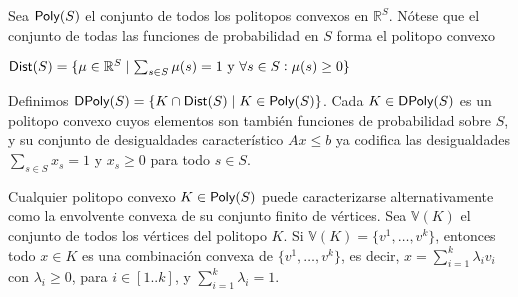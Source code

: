Sea \( \textsf{Poly}(S) \) el conjunto de todos los politopos convexos en \(
\mathbb{R}^S \). Nótese que el conjunto de todas las funciones de probabilidad
en \( S \) forma el politopo convexo

\( \textsf{Dist}(S) = \{ \mu \in \mathbb{R}^S \mid \sum_{s \in S} \mu(s) = 1 \text{ y } \forall s \in S : \mu(s) \geq 0 \} \)

Definimos \( \textsf{DPoly}(S) = \{ K \cap \textsf{Dist}(S) \mid K \in \textsf{Poly}(S) \} \). Cada \(
K \in \textsf{DPoly}(S) \) es un politopo convexo cuyos elementos son también funciones
de probabilidad sobre \( S \), y su conjunto de desigualdades característico \(
Ax \leq b \) ya codifica las desigualdades \( \sum_{s \in S} x_s = 1 \) y \(
x_s \geq 0 \) para todo \( s \in S \).

Cualquier politopo convexo \( K \in \textsf{Poly}(S) \) puede caracterizarse
alternativamente como la envolvente convexa de su conjunto finito de vértices.
Sea \( \mathbb{V}(K) \) el conjunto de todos los vértices del politopo \( K \).
Si \( \mathbb{V}(K) = \{v^1, \dots, v^k\} \), entonces todo \( x \in K \) es
una combinación convexa de \( \{v^1, \dots, v^k\} \), es decir, \( x =
\sum_{i=1}^{k} \lambda_i v_i \) con \( \lambda_i \geq 0 \), para \( i \in
[1..k] \), y \( \sum_{i=1}^{k} \lambda_i = 1 \).





